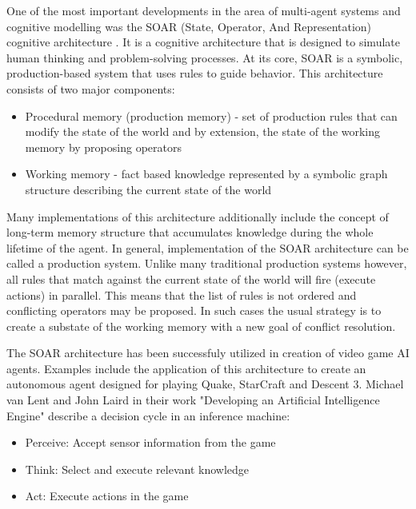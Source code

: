 One of the most important developments in the area of multi-agent systems and cognitive modelling was the SOAR (State, Operator, And Representation) cognitive architecture \cite{laird2019soar}.
It is a cognitive architecture that is designed to simulate human thinking and problem-solving processes.
At its core, SOAR is a symbolic, production-based system that uses rules to guide behavior.
This architecture consists of two major components:

\begin{itemize}
    \item Procedural memory (production memory) - set of production rules that can modify the state of the world and by extension, the state of the working memory by proposing operators
    \item Working memory - fact based knowledge represented by a symbolic graph structure describing the current state of the world
\end{itemize}

Many implementations of this architecture additionally include the concept of long-term memory structure that accumulates knowledge during the whole lifetime of the agent.
In general, implementation of the SOAR architecture can be called a production system.
Unlike many traditional production systems however, all rules that match against the current state of the world will fire (execute actions) in parallel.
This means that the list of rules is not ordered and conflicting operators may be proposed.
In such cases the usual strategy is to create a substate of the working memory with a new goal of conflict resolution.

The SOAR architecture has been successfuly utilized in creation of video game AI agents.
Examples include the application of this architecture to create an autonomous agent designed for playing Quake\cite{laird2001knows}, StarCraft\cite{turner2013soar-sc} and Descent 3\cite{van1999developing}.
Michael van Lent and John Laird in their work "Developing an Artificial Intelligence Engine"\cite{van1999developing} describe a decision cycle in an inference machine:

\begin{itemize}
    \item Perceive: Accept sensor information from the game
    \item Think: Select and execute relevant knowledge
    \item Act: Execute actions in the game
\end{itemize}

